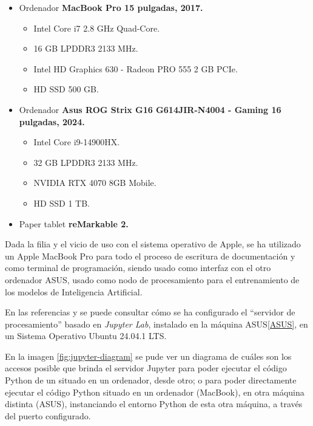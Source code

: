 \begin{itemize}
    \item Ordenador \textbf{MacBook Pro 15 pulgadas, 2017.}
    \begin{itemize}
        \item Intel Core i7 2.8 GHz Quad-Core.
        \item 16 GB LPDDR3 2133 MHz.
        \item Intel HD Graphics 630 - Radeon PRO 555 2 GB PCIe.
        \item HD SSD 500 GB.
    \end{itemize}
    \item Ordenador \textbf{Asus ROG Strix G16 G614JIR-N4004 - Gaming 16 pulgadas, 2024.}
    \label{ASUS}
    \begin{itemize}
        \item Intel Core i9-14900HX.
        \item 32 GB LPDDR3 2133 MHz.
        \item NVIDIA RTX 4070 8GB Mobile.
        \item HD SSD 1 TB.
    \end{itemize}
    \item Paper tablet \textbf{reMarkable 2.}
\end{itemize}

Dada la filia y el vicio de uso con el sistema operativo de Apple, se ha utilizado un Apple MacBook Pro para todo el proceso de escritura de documentación y como terminal de programación, siendo usado como interfaz con el otro ordenador ASUS, usado como nodo de procesamiento para el entrenamiento de los modelos de Inteligencia Artificial.

En las referencias \cite{geeksforgeeks2025jupyter} y \cite{vscode2025jupyter} se puede consultar cómo se ha configurado el ``servidor de procesamiento'' basado en \emph{Jupyter Lab}, instalado en la máquina ASUS\ref{ASUS}, en un Sistema Operativo Ubuntu 24.04.1 LTS.

En la imagen \ref{fig:jupyter-diagram} se pude ver un diagrama de cuáles son los accesos posible que brinda el servidor Jupyter para poder ejecutar el código Python de un situado en un ordenador, desde otro; o para poder directamente ejecutar el código Python situado en un ordenador (MacBook), en otra máquina distinta (ASUS), instanciando el entorno Python de esta otra máquina, a través del puerto configurado.

